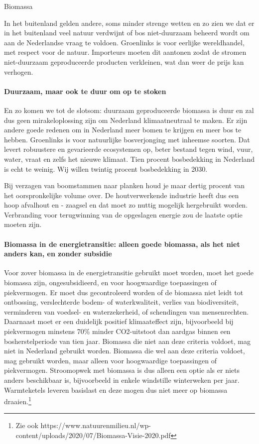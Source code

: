 \begin{voorstel}{Biomassa}
\begin{overwegingen}
In het buitenland gelden andere, soms minder strenge wetten en zo zien we dat er in het buitenland veel natuur verdwijnt of bos niet-duurzaam beheerd wordt om aan de Nederlandse vraag te voldoen. Groenlinks is voor eerlijke wereldhandel, met respect voor de natuur. Importeurs  moeten dit aantonen zodat de stromen niet-duurzaam geproduceerde producten verkleinen, wat dan weer de prijs kan verhogen.

\paragraph{Duurzaam, maar ook te duur om op te stoken}
En zo komen we tot de slotsom: duurzaam geproduceerde biomassa is duur en zal dus geen mirakeloplossing zijn om Nederland klimaatneutraal te maken. Er zijn andere goede redenen om in Nederland meer bomen te krijgen en meer bos te hebben. Groenlinks is voor natuurlijke bosverjonging met inheemse soorten. Dat levert robuustere en gevarieerde ecosystemen op, beter bestand tegen wind, vuur, water, vraat en zelfs het nieuwe klimaat. Tien procent bosbedekking in Nederland is echt te weinig. Wij willen twintig procent bosbedekking in 2030.

Bij verzagen van boomstammen naar planken houd je maar dertig procent van het oorspronkelijke volume over. De houtverwerkende industrie heeft dus een hoop afvalhout en - zaagsel en dat moet zo nuttig mogelijk hergebruikt worden. Verbranding voor terugwinning van de opgeslagen energie zou de laatste optie moeten zijn.

\paragraph{Biomassa in de energietransitie: alleen goede biomassa, als het niet anders kan, en zonder subsidie}
Voor zover biomassa in de energietransitie gebruikt moet worden, moet het goede biomassa zijn, ongesubsidieerd, en voor hoogwaardige toepassingen of piekvermogen. Er moet dus gecontroleerd worden of de biomassa niet leidt tot ontbossing, verslechterde bodem- of waterkwaliteit, verlies van biodiversiteit, verminderen van voedsel- en waterzekerheid, of schendingen van mensenrechten. Daarnaast moet er een duidelijk positief klimaateffect zijn, bijvoorbeeld bij piekvermogen minstens 70\% minder CO2-uitstoot dan aardgas binnen een bosherstelperiode van tien jaar. Biomassa die niet aan deze criteria voldoet, mag niet in Nederland gebruikt worden. Biomassa die wel aan deze criteria voldoet, mag gebruikt worden, maar alleen voor hoogwaardige toepassingen of piekvermogen. Stroomopwek met biomassa is dus alleen een optie als er niets anders beschikbaar is, bijvoorbeeld in enkele windstille winterweken per jaar. Warmteketels leveren basislast en deze mogen dus niet meer op biomassa draaien.\footnote{Zie ook https://www.natuurenmilieu.nl/wp-content/uploads/2020/07/Biomassa-Visie-2020.pdf}


\end{overwegingen}
\end{voorstel}
